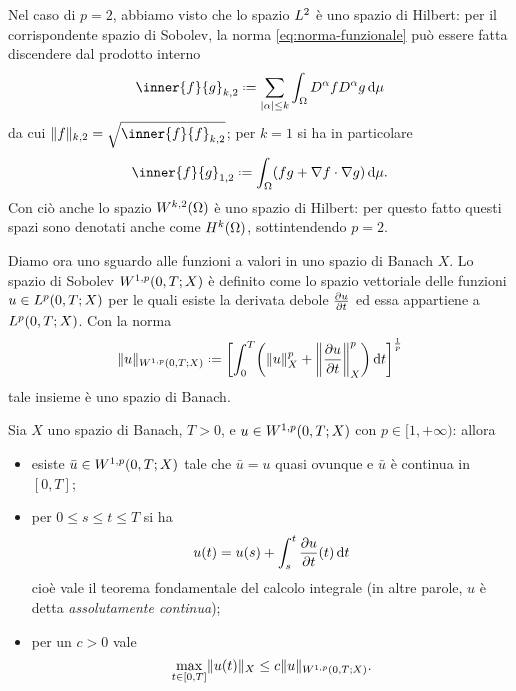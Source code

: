 Nel caso di $p=2$, abbiamo visto che lo spazio $\lclass[2]$ è uno spazio di Hilbert: per il corrispondente spazio di Sobolev, la norma \eqref{eq:norma-funzionale} può essere fatta discendere dal prodotto interno
\begin{equation}
    \inner{f}{g}_{k,2}\defeq
    \sum_{\abs{\alpha}\le k}\int_\Omega D^\alpha fD^\alpha g\,\dd\mu
    \label{eq:prodotto-interno-Wk2}
\end{equation}
da cui $\norm{f}_{k,2}=\sqrt{\inner{f}{f}_{k,2}}$; per $k=1$ si ha in particolare
\begin{equation}
    \inner{f}{g}_{1,2}\defeq
    \int_\Omega (fg+\scalar{\grad f}{\grad g})\,\dd\mu.
    \label{eq:prodotto-interno-W12}
\end{equation}
Con ciò anche lo spazio $\sobW[k,2]{\Omega}$ è uno spazio di Hilbert: per questo fatto questi spazi sono denotati anche come $\sobH[k]{\Omega}$, sottintendendo $p=2$.

Diamo ora uno sguardo alle funzioni a valori in uno spazio di Banach $X$.
Lo spazio di Sobolev $\sobW[1,p]{0,T;X}$ è definito come lo spazio vettoriale delle funzioni $u\in\leb[p]{0,T;X}$ per le quali esiste la derivata debole $\drp{u}{t}$ ed essa appartiene a $\leb[p]{0,T;X}$.
Con la norma
\begin{equation}
    \norm{u}_{\sobW[1,p]{0,T;X}}\defeq\biggl[\int_0^T\biggl(\norm{u}_X^p+\norm[\bigg]{\drp{u}{t}}_X^p\biggr)\,\dd t\biggr]^\frac1{p}
    \label{eq:norma-sobolev-banach}
\end{equation}
tale insieme è uno spazio di Banach.
\begin{teorema}
    Sia $X$ uno spazio di Banach, $T>0$, e $u\in\sobW[1,p]{0,T;X}$ con $p\in[1,+\infty)$: allora
    \begin{itemize}
        \item esiste $\bar{u}\in\sobW[1,p]{0,T;X}$ tale che $\bar{u}=u$ quasi ovunque e $\bar{u}$ è continua in $[0,T]$;
        \item per $0\le s\le t\le T$ si ha
            \begin{equation}
                u(t)=u(s)+\int_s^t\drp{u}{t}(t)\,\dd t
            \end{equation}
            cioè vale il teorema fondamentale del calcolo integrale (in altre parole, $u$ è detta \emph{assolutamente continua});
        \item per un $c>0$ vale
            \begin{equation}
                \max_{t\in[0,T]}\norm{u(t)}_X\le c\norm{u}_{\sobW[1,p]{0,T;X}}.
            \end{equation}
    \end{itemize}
\end{teorema}

